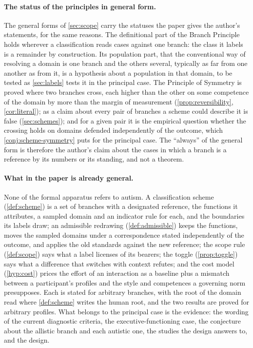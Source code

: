 \paragraph{The status of the principles in general form.} The general forms of \autoref{sec:scope} carry the statuses the paper gives the author's statements, for the same reasons. The definitional part of the Branch Principle holds wherever a classification reads cases against one branch: the class it labels is a remainder by construction. Its population part, that the conventional way of resolving a domain is one branch and the others several, typically as far from one another as from it, is a hypothesis about a population in that domain, to be tested as \autoref{sec:labels} tests it in the principal case. The Principle of Symmetry is proved where two branches cross, each higher than the other on some competence of the domain by more than the margin of measurement (\autoref{prop:reversibility}, \autoref{cor:literal}); as a claim about every pair of branches a scheme could describe it is false (\autoref{sec:schemes}); and for a given pair it is the empirical question whether the crossing holds on domains defended independently of the outcome, which \autoref{conj:scheme-symmetry} puts for the principal case. The ``always'' of the general form is therefore the author's claim about the cases in which a branch is a reference by its numbers or its standing, and not a theorem.

\paragraph{What in the paper is already general.} None of the formal apparatus refers to autism. A classification scheme (\autoref{def:scheme}) is a set of branches with a designated reference, the functions it attributes, a sampled domain and an indicator rule for each, and the boundaries its labels draw; an admissible redrawing (\autoref{def:admissible}) keeps the functions, moves the sampled domains under a correspondence stated independently of the outcome, and applies the old standards against the new reference; the scope rule (\autoref{def:scope}) says what a label licenses of its bearers; the toggle (\autoref{prop:toggle}) says what a difference that switches with context refutes; and the cost model (\autoref{hyp:cost}) prices the effort of an interaction as a baseline plus a mismatch between a participant's profiles and the style and competences a governing norm presupposes. Each is stated for arbitrary branches, with the root of the domain read where \autoref{def:scheme} writes the human root, and the two results are proved for arbitrary profiles. What belongs to the principal case is the evidence: the wording of the current diagnostic criteria, the executive-functioning case, the conjecture about the allistic branch and each autistic one, the studies the design answers to, and the design.

